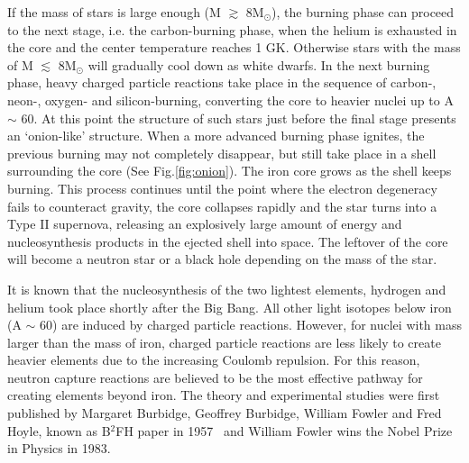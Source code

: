 If the mass of stars is large enough (M $\gtrsim$ 8M$_\odot$), the burning phase can proceed to the next stage, i.e. the carbon-burning phase, when the helium is exhausted in the core and the  center temperature reaches 1 GK. Otherwise stars with the mass of M $\lesssim$ 8M$_\odot$ will gradually cool down as white dwarfs.  In the next burning phase, heavy charged particle reactions take place in the sequence of carbon-, neon-, oxygen- and silicon-burning, converting the core to heavier nuclei up to A $\sim$ 60. At this point the structure of such stars just before the final stage presents an `onion-like' structure. When a more advanced burning phase ignites, the previous burning may not completely disappear, but still take place in a shell surrounding the core (See Fig.\ref{fig:onion}). The iron core grows as the shell keeps burning. This process continues until the point where the electron degeneracy fails to counteract  gravity, the core collapses rapidly and the star turns into a Type II supernova, releasing an explosively  large amount of energy and nucleosynthesis products in the ejected shell into  space. The leftover of the core will become a neutron star or a black hole depending on the mass of the star.




It is known that the nucleosynthesis of the two lightest elements, hydrogen and helium took place shortly after the Big Bang. All other light isotopes below iron (A $\sim$ 60) are induced by charged particle reactions. However,  for nuclei with mass larger than the mass of iron, charged particle reactions are less likely to create heavier elements due to the increasing Coulomb repulsion. For this reason, neutron capture reactions are believed to be the most effective pathway for creating elements beyond iron. The theory and experimental studies were first published by Margaret Burbidge, Geoffrey Burbidge, William Fowler and Fred Hoyle, known as B$^2$FH paper in 1957~\citep{B2FH} and William Fowler wins the Nobel Prize in Physics in 1983.

